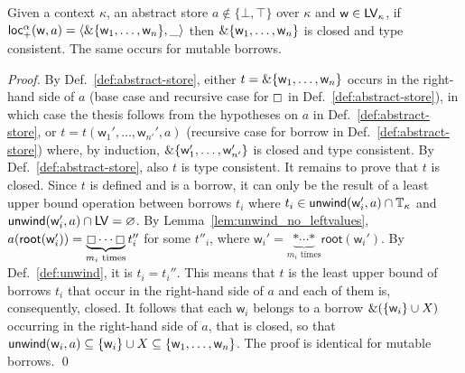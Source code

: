 \begin{lemma}\label{lem:consistency}
  Given a context $\kappa$, an abstract store $a\not\in\{\bot,\top\}$ over $\kappa$ and
  $\mathsf{w}\in\mathsf{LV}_\kappa$, if
  $\mathsf{loc_+^\alpha}(\mathsf{w},a)=\langle\&\{\mathsf{w}_1,\ldots,\mathsf{w}_n\},\_\rangle$
  then $\&\{\mathsf{w}_1,\ldots,\mathsf{w}_n\}$ is closed and type consistent.
  The same occurs for mutable borrows.
\end{lemma}
\begin{proof}
  By Def.~\ref{def:abstract-store}, either
  $t=\&\{\mathsf{w}_1,\ldots,\mathsf{w}_n\}$
  occurs in the right-hand side of $a$ (base case and recursive case
  for $\boxempty$ in Def.~\ref{def:abstract-store}), in which case the
  thesis follows from the hypotheses on $a$ in Def.~\ref{def:abstract-store},
  or $t=t(\mathsf{w}_1',\ldots,\mathsf{w}_{n'}',a)$ (recursive case for
  borrow in Def.~\ref{def:abstract-store}) where, by induction,
  $\&\{\mathsf{w}_1',\ldots,\mathsf{w}'_{n'}\}$ is closed and type consistent.
  By Def.~\ref{def:abstract-store}, also $t$ is type consistent.
  It remains to prove that $t$ is closed.
  Since $t$ is defined and is a borrow, it can only be the result of a least upper bound operation
  between borrows $t_i$ where $t_i\in\mathsf{unwind}(\mathsf{w}_i',a)\cap\mathbb{T}_\kappa$
  and $\mathsf{unwind}(\mathsf{w}_i',a)\cap\mathsf{LV}=\varnothing$.
  By Lemma~\ref{lem:unwind_no_leftvalues},
  $a(\mathsf{root}(\mathsf{w}_i'))=\underbrace{\boxempty\cdots\boxempty}_\text{$m_i$ times}t''_i$ for some $t''_i$,
  where $\mathsf{w}_i'=\underbrace{\mathtt{*}\cdots\mathtt{*}}_{\text{$m_i$ times}}\mathsf{root}(\mathsf{w}_i')$.
  By Def.~\ref{def:unwind}, it is $t_i=t_i''$. This means that $t$ is the least upper bound
  of borrows $t_i$ that occur in the right-hand side of $a$ and each of them is, consequently, closed.
  It follows that each $\mathsf{w}_i$ belongs to a borrow
  $\&(\{\mathsf{w}_i\}\cup X)$ occurring in the right-hand side of $a$,
  that is closed, so that $\mathsf{unwind}(\mathsf{w}_i,a)\subseteq\{\mathsf{w}_i\}\cup X\subseteq\{\mathsf{w}_1,\dots,\mathsf{w}_n\}$.
  The proof is identical for mutable borrows.
  \qed
\end{proof}


